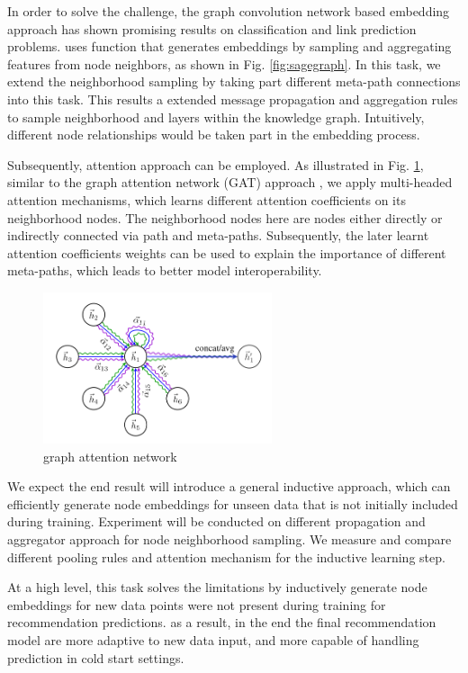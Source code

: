 In order to solve the challenge, the graph convolution network based embedding approach has shown promising results on classification and link prediction problems. \citet{hamilton2017inductive} uses function that generates embeddings by sampling and aggregating features from node neighbors, as shown in Fig. \ref{fig:sagegraph}. In this task, we extend the neighborhood sampling by taking part different meta-path connections into this task. This results a extended message propagation and aggregation rules to sample neighborhood and layers within the knowledge graph. Intuitively, different node relationships would be taken part in the embedding process.

Subsequently, attention approach can be employed. As illustrated in Fig. \ref{fig:gat}, similar to the graph attention network (GAT) approach \citep{velivckovic2017graph}, we apply multi-headed attention mechanisms, which learns different attention coefficients on its neighborhood nodes. The neighborhood nodes here are nodes either directly or indirectly connected via path and meta-paths. Subsequently, the later learnt attention coefficients weights can be used to explain the importance of different meta-paths, which leads to better model interoperability.

\begin{figure}[!h]
    \centering
    \includegraphics[width=0.6\textwidth]{figs/gat.png}
    \caption{graph attention network}\label{fig:gat}
\end{figure}

We expect the end result will introduce a general inductive approach, which can efficiently generate node embeddings for unseen data that is not initially included during training.
Experiment will be conducted on different propagation and aggregator approach for node neighborhood sampling. We measure and compare different pooling rules and attention mechanism for the inductive learning step.

At a high level, this task solves the limitations by inductively generate node embeddings for new data points were not present during training for recommendation predictions. as a result, in the end the final recommendation model are more adaptive to new data input, and more capable of handling prediction in cold start settings.


